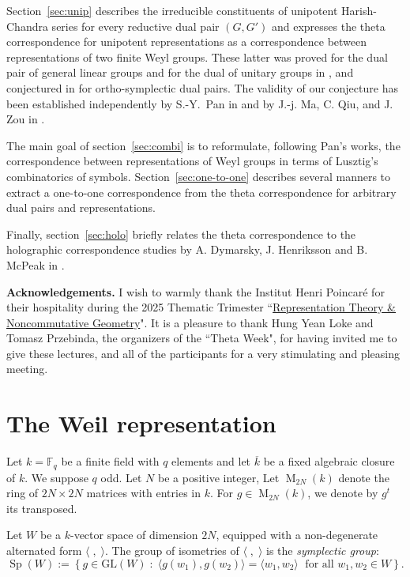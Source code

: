 \documentclass[12pt]{amsart}
\numberwithin{equation}{subsection}
\newcommand{\Fq}{{\mathbb{F}_q}}
\newcommand{\GL}{\mathrm{GL}}
\newcommand{\Sp}{\operatorname{Sp}}
\newcommand{\Mat}{\operatorname{M}}
\begin{document}
Section~\ref{sec:unip} describes the irreducible constituents of unipotent Harish-Chandra series for every reductive dual pair $(G,G')$ and expresses the theta correspondence for unipotent representations 
as a correspondence between representations of two finite Weyl groups. These latter was proved for the dual pair of general linear groups and for the dual of unitary groups in \cite{AMR}, and conjectured in \cite{AMR} for ortho-symplectic dual pairs.
The validity of our conjecture has been established independently by S.-Y.~Pan in \cite{PanAJM} and by J.-j. Ma, C. Qiu, and J. Zou in \cite{MQZ}.

The main goal of section~\ref{sec:combi} is to reformulate, following Pan's works, the correspondence between representations of Weyl groups in terms of  Lusztig's combinatorics of symbols. 
Section~\ref{sec:one-to-one} describes several manners to extract a one-to-one correspondence from the theta correspondence for arbitrary dual pairs and representations.

Finally, section~\ref{sec:holo} briefly relates the theta correspondence to the holographic correspondence studies by A. Dymarsky, J. Henriksson and B. McPeak in \cite{DHM}.

\bigskip

\noindent
\textbf{Acknowledgements.} I wish to warmly thank the Institut Henri Poincar\'e for their hospitality during the 2025 Thematic Trimester ``\href{https://indico.math.cnrs.fr/event/10843/}{Representation Theory \& Noncommutative Geometry}". It is a pleasure to thank  
Hung Yean Loke and Tomasz Przebinda, the organizers of the ``Theta Week", for having invited me to give these lectures, and all of the participants for a  very stimulating and pleasing meeting.
 
\section{The Weil representation} \label{sec:Weil}
Let $k=\Fq$ be a finite field with $q$ elements and let  $\overline{k}$ be a fixed algebraic closure of $k$. We suppose $q$ odd. Let $N$ be a positive integer,
Let $\Mat_{2N}(k)$ denote the ring of $2N\times 2N$ matrices with entries in $k$. For  $g\in\Mat_{2N}(k)$, we denote by $g^t$ its transposed.
 
Let $W$ be a $k$-vector space of dimension $2N$, equipped with a non-degenerate alternated form  $\langle\;,\;\rangle$. 
The group of isometries of  $\langle\;,\;\rangle$  is the \textit{symplectic group}:
\begin{equation}
\Sp(W) := \left\{g \in\GL(W) \;:\; \langle g(w_1),g(w_2)\rangle=  \langle w_1,w_2  \rangle\;\text{ for all $w_1,w_2\in W$}\right\}.
\end{equation}
\end{document}
